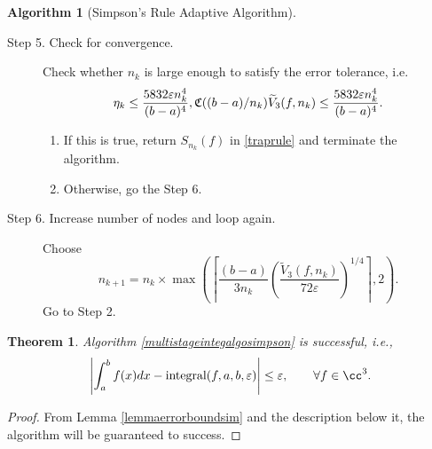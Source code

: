 \documentclass{iitthesis}
\newtheorem{theorem}{Theorem}
\theoremstyle{definition}
\newtheorem{algo}{Algorithm}
\theoremstyle{remark}
\begin{document}
\begin{algo} [Simpson's Rule Adaptive Algorithm]
\begin{description}
\item[Step 5. Check for convergence.] Check whether $n_k$ is large enough to satisfy the error tolerance, i.e.
    \begin{equation*}
        \eta_{k} \le \frac{5832\varepsilon n_k^4}{(b-a)^4},\\
        \mathfrak{C}((b-a)/n_k)\widetilde{V}_3(f,n_k) \le \frac{5832\varepsilon n_k^4}{(b-a)^4}.
    \end{equation*}

    \begin{enumerate}[label=\alph*)]
      \item If this is true, return $S_{n_k}(f)$ in \eqref{traprule} and terminate the algorithm.
      \item Otherwise, go the Step 6.
    \end{enumerate}


\item[Step 6. Increase number of nodes and loop again.] Choose
$$
n_{k+1}=n_k\times\max\left(\left\lceil\frac{(b-a)}{3n_{k}}\left(\frac{\widetilde{V}_3(f,n_k)}{72\varepsilon}\right)^{1/4}\right\rceil,2\right).
$$
Go to Step 2.
\end{description}
\end{algo}

\begin{theorem}\label{thmSimpson}
    Algorithm \ref{multistageintegalgosimpson} is successful, i.e.,
    \begin{equation*}
      \left|\int_{a}^{b}f(x)dx-\textup{integral}(f,a,b,\varepsilon)\right|\le\varepsilon, \qquad \forall f\in \cc^3.
    \end{equation*}
\end{theorem}
\begin{proof}
 From Lemma \ref{lemmaerrorboundsim} and the description below it, the algorithm will be guaranteed to success.
\end{proof}
\end{document}
